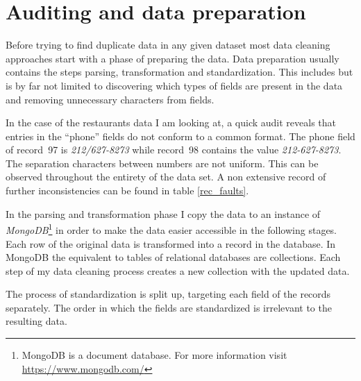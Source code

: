 \documentclass[conference]{IEEEtran}
\begin{document}
\section{Auditing and data preparation}\label{prep}
Before trying to find duplicate data in any given dataset most data cleaning approaches start with a phase of preparing the data. Data preparation usually contains the steps parsing, transformation and standardization. This includes but is by far not limited to discovering which types of fields are present in the data and removing unnecessary characters from fields. 

In the case of the restaurants data I am looking at, a quick audit reveals that entries in the \enquote{phone} fields do not conform to a common format. The phone field of record~97 is \emph{212/627-8273} while record~98 contains the value \emph{212-627-8273}. The separation characters between numbers are not uniform. This can be observed throughout the entirety of the data set. A non extensive record of further inconsistencies can be found in table \ref{rec_faults}. 

In the parsing and transformation phase I copy the data to an instance of \emph{MongoDB}\footnote{MongoDB is a document database. For more information visit \url{https://www.mongodb.com/}} in order to make the data easier accessible in the following stages. Each row of the original data is transformed into a record in the database. In MongoDB the equivalent to tables of relational databases are collections. Each step of my data cleaning process creates a new collection with the updated data.

The process of standardization is split up, targeting each field of the records separately. The order in which the fields are standardized is irrelevant to the resulting data.
\end{document}
